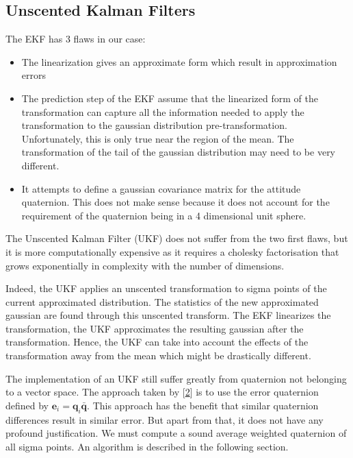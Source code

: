 \documentclass[12pt,]{article}
\providecommand{\tightlist}{%
  \setlength{\itemsep}{0pt}\setlength{\parskip}{0pt}}
\begin{document}
\subsection{Unscented Kalman Filters}\label{unscented-kalman-filters}

The EKF has 3 flaws in our case:

\begin{itemize}
\tightlist
\item
  The linearization gives an approximate form which result in
  approximation errors
\item
  The prediction step of the EKF assume that the linearized form of the
  transformation can capture all the information needed to apply the
  transformation to the gaussian distribution pre-transformation.
  Unfortunately, this is only true near the region of the mean. The
  transformation of the tail of the gaussian distribution may need to be
  very different.
\item
  It attempts to define a gaussian covariance matrix for the attitude
  quaternion. This does not make sense because it does not account for
  the requirement of the quaternion being in a 4 dimensional unit
  sphere.
\end{itemize}

The Unscented Kalman Filter (UKF) does not suffer from the two first
flaws, but it is more computationally expensive as it requires a
cholesky factorisation that grows exponentially in complexity with the
number of dimensions.

Indeed, the UKF applies an unscented transformation to sigma points of
the current approximated distribution. The statistics of the new
approximated gaussian are found through this unscented transform. The
EKF linearizes the transformation, the UKF approximates the resulting
gaussian after the transformation. Hence, the UKF can take into account
the effects of the transformation away from the mean which might be
drastically different.

The implementation of an UKF still suffer greatly from quaternion not
belonging to a vector space. The approach taken by
{[}\protect\hyperlink{ref-edgar_quaternion-based_nodate}{2}{]} is to use
the error quaternion defined by
\(\mathbf{e}_i = \mathbf{q}_i\bar{\mathbf{q}}\). This approach has the
benefit that similar quaternion differences result in similar error. But
apart from that, it does not have any profound justification. We must
compute a sound average weighted quaternion of all sigma points. An
algorithm is described in the following section.
\end{document}
